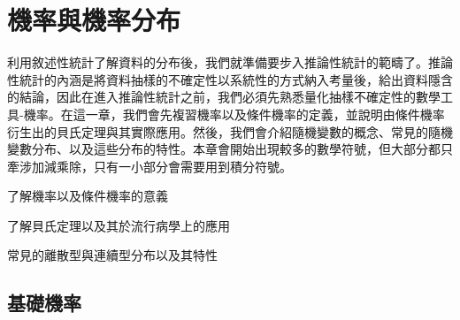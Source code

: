 \chapter{機率與機率分布}
    利用敘述性統計了解資料的分布後，我們就準備要步入推論性統計的範疇了。推論性統計的內涵是將資料抽樣的不確定性以系統性的方式納入考量後，給出資料隱含的結論，因此在進入推論性統計之前，我們必須先熟悉量化抽樣不確定性的數學工具-機率。在這一章，我們會先複習機率以及條件機率的定義，並說明由條件機率衍生出的貝氏定理與其實際應用。然後，我們會介紹隨機變數的概念、常見的隨機變數分布、以及這些分布的特性。本章會開始出現較多的數學符號，但大部分都只牽涉加減乘除，只有一小部分會需要用到積分符號。
    
    \begin{introduction}
        \item 了解機率以及條件機率的意義
        \item 了解貝氏定理以及其於流行病學上的應用
        \item 常見的離散型與連續型分布以及其特性
    \end{introduction}

\section{基礎機率}
